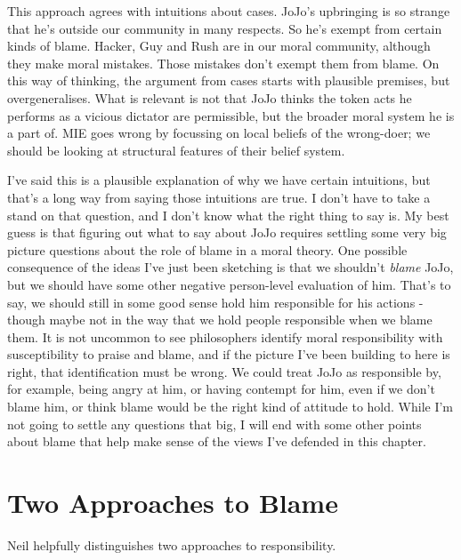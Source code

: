 This approach agrees with intuitions about cases. \gls{JoJo}'s upbringing is so strange that he's outside our community in many respects. So he's exempt from certain kinds of blame. \gls{Hacker}, \gls{Guy} and \gls{Rush} are in our moral community, although they make moral mistakes. Those mistakes don't exempt them from blame. On this way of thinking, the argument from cases starts with plausible premises, but overgeneralises. What is relevant is not that \gls{JoJo} thinks the token acts he performs as a vicious dictator are permissible, but the broader moral system he is a part of. MIE goes wrong by focussing on local beliefs of the wrong-doer; we should be looking at structural features of their belief system.

I've said this is a plausible explanation of why we have certain intuitions, but that's a long way from saying those intuitions are true. I don't have to take a stand on that question, and I don't know what the right thing to say is. My best guess is that figuring out what to say about \gls{JoJo} requires settling some very big picture questions about the role of blame in a moral theory. One possible consequence of the ideas I've just been sketching is that we shouldn't \emph{blame} \gls{JoJo}, but we should have some other negative person-level evaluation of him. That's to say, we should still in some good sense hold him responsible for his actions - though maybe not in the way that we hold people responsible when we blame them. It is not uncommon to see philosophers identify moral responsibility with susceptibility to praise and blame, and if the picture I've been building to here is right, that identification must be wrong. We could treat \gls{JoJo} as responsible by, for example, being angry at him, or having contempt for him, even if we don't blame him, or think blame would be the right kind of attitude to hold. While I'm not going to settle any questions that big, I will end with some other points about blame that help make sense of the views I've defended in this chapter.

\section{Two Approaches to Blame}
\label{twoapproachestoblame}

Neil \citet{Levy2005} helpfully distinguishes two approaches to responsibility.

